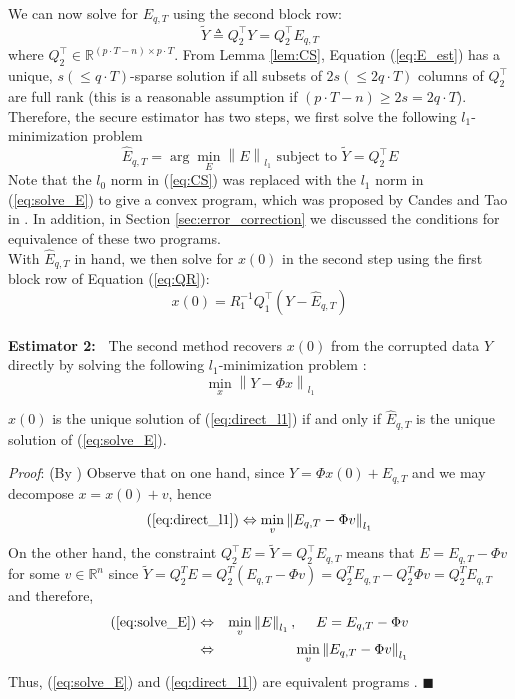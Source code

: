 \documentclass[../../thesis.tex]{subfiles}
\newcommand{\norm}[1]{\left\lVert#1\right\rVert}
\begin{document}
We can now solve for $E_{q,T}$ using the second block row:
\begin{equation}
	\tilde Y \triangleq Q_2^\top Y = Q_2^\top E_{q,T}
	\label{eq:E_est}
\end{equation}
where $Q_2^\top \in \mathbb {R} ^{ (p\cdot T-n) \times p\cdot T}$. From Lemma \ref{lem:CS}, Equation (\ref{eq:E_est}) has a unique, $s(\le q\cdot T)$-sparse solution if all subsets of $2s(\le2 q\cdot T)$ columns of $Q_2^\top$ are full rank (this is a reasonable assumption if $ (p\cdot T-n) \ge 2s = 2q\cdot T$). 
Therefore, the secure estimator has two steps, we first solve the following $l_1$-minimization problem
\begin{equation}
	\hat E_{q,T} = \arg \min_E \norm { E}_{l_1} \text{ subject to } \tilde Y = Q_2^\top E 
	\label{eq:solve_E}
\end{equation}
Note that the $l_0$ norm in (\ref{eq:CS}) was replaced with the $l_1$ norm in (\ref{eq:solve_E}) to give a convex program, which was proposed by Candes and Tao in \cite{tao11}. In addition, in Section \ref{sec:error_correction} we discussed the conditions for equivalence of these two programs.\\
With $\hat E_{q,T}$ in hand, we then solve for $x(0)$ in the second step using the first block row of Equation (\ref{eq:QR}):
\begin{equation}
	x(0) = R_1^{-1} Q_1^\top (Y- \hat E_{q,T})
	\label{eq:QR1}
\end{equation}
\\
{\bf Estimator 2:~} 
The second method recovers $x(0)$ from the corrupted data $Y$ directly by %
solving the following $l_1$-minimization problem \cite{tao11}:
\begin{equation}
	\min_x \norm { Y  - \Phi x}_{l_1}
	\label{eq:direct_l1}
\end{equation}

\begin{lem} \label{lem:equivalent}
 $x(0)$ is the unique solution of (\ref{eq:direct_l1}) if and only if ${\hat E}_{q,T}$ is the unique solution of (\ref{eq:solve_E}).
\end{lem}

\textit{Proof}:
 (By \cite{tao11}) Observe that on one hand, since $Y = \Phi x(0) + E_{q,T}$ and we may decompose $x = x(0) + v$, hence 
\begin{equation}
	(\ref{eq:direct_l1}) \Leftrightarrow \min_v \norm{  E_{q,T} - \Phi v }_{l_1} \nonumber 
\end{equation}
On the other hand, the constraint $Q_2^\top E = \tilde Y = Q_2^\top E_{q,T}$ means that $E = E_{q,T} - \Phi v $ for some $v \in \mathbb{R}^n$ since $\tilde Y = Q_2^T E = Q_2^T (E_{q,T} - \Phi v) = Q_2^T E_{q,T} - Q_2^T \Phi v = Q_2^T E_{q,T}$ and therefore,
\begin{eqnarray}
	(\ref{eq:solve_E}) &\Leftrightarrow& \min_v \norm{ E }_{l_1}, ~~~~ E = E_{q,T}-\Phi v  \nonumber \\
				 & \Leftrightarrow& \min_v  \norm{E_{q,T}-\Phi v}_{l_1} \nonumber 
\end{eqnarray}
Thus, (\ref{eq:solve_E}) and (\ref{eq:direct_l1}) are equivalent programs \cite{tao11}.
\hfill$\blacksquare$\\
\end{document}
